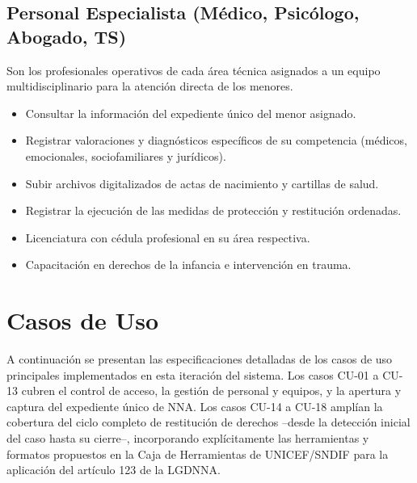 \begin{Usuario}{\hypertarget{actEspecialista}{\subsection{Personal Especialista (Médico, Psicólogo, Abogado, TS)}}}{
		Son los profesionales operativos de cada área técnica asignados a un equipo multidisciplinario para la atención directa de los menores.
	}
	\item[Responsabilidades:] \cdtEmpty
	\begin{itemize}
		\item Consultar la información del expediente único del menor asignado.
		\item Registrar valoraciones y diagnósticos específicos de su competencia (médicos, emocionales, sociofamiliares y jurídicos).
		\item Subir archivos digitalizados de actas de nacimiento y cartillas de salud.
		\item Registrar la ejecución de las medidas de protección y restitución ordenadas.
	\end{itemize}
	\item[Perfil:] \cdtEmpty
	\begin{itemize}
		\item Licenciatura con cédula profesional en su área respectiva.
		\item Capacitación en derechos de la infancia e intervención en trauma.
	\end{itemize}
\end{Usuario}

\cleardoublepage
\section{Casos de Uso}

A continuación se presentan las especificaciones detalladas de los casos de uso principales implementados en esta iteración del sistema. Los casos CU-01 a CU-13 cubren el control de acceso, la gestión de personal y equipos, y la apertura y captura del expediente único de NNA. Los casos CU-14 a CU-18 amplían la cobertura del ciclo completo de restitución de derechos --desde la detección inicial del caso hasta su cierre--, incorporando explícitamente las herramientas y formatos propuestos en la Caja de Herramientas de UNICEF/SNDIF para la aplicación del artículo 123 de la LGDNNA.

